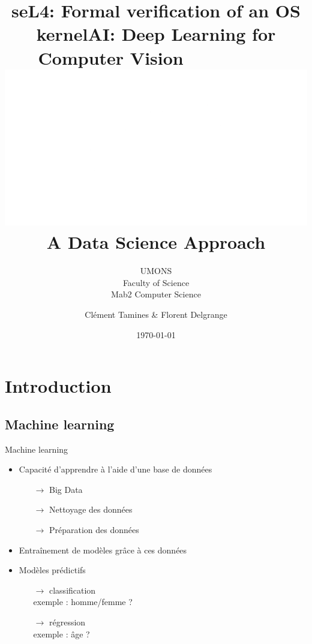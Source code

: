 \documentclass[compress]{beamer}
\title{seL4: Formal verification of an OS kernel} %
\author{Clément Tamines \& Florent Delgrange}
\subtitle{\normalsize UMONS \\ Faculty of Science \\ Mab2 Computer Science}
\date{\today}
\title{AI: Deep Learning for\\\vspace{-.05\linewidth} Computer Vision $\quad  \quad \quad \quad \quad$\includegraphics[width=0.2\linewidth]{resources/eye}\\
{\normalsize A Data Science Approach}} %
\begin{document}
  \begin{frame}[plain]
    \maketitle
  \end{frame}

  \AtBeginSection[]
    {
      \begin{frame}{\contentsname}
      \tableofcontents[currentsection]
      \end{frame}
    }

\section{Introduction}
\subsection{Machine learning}
\begin{frame}{Machine learning}
  \begin{itemize}
    \item Capacité d'{\color{fibeamer@orange}apprendre} à l'aide d'une {\color{fibeamer@orange}base de données}
    \begin{itemize}
      \item[$\rightarrow$] Big Data
      \item[$\rightarrow$] Nettoyage des données
      \item[$\rightarrow$] Préparation des données
    \end{itemize}
    \item {\color{fibeamer@orange}Entraînement} de {\color{fibeamer@orange}modèles} grâce à ces données
    \item Modèles {\color{fibeamer@orange}prédictifs}
    \begin{itemize}
      \item[$\rightarrow$] classification\\
        exemple : homme/femme ?
      \item[$\rightarrow$] régression\\
        exemple : âge ?
    \end{itemize}
  \end{itemize}
\end{frame}
\end{document}
